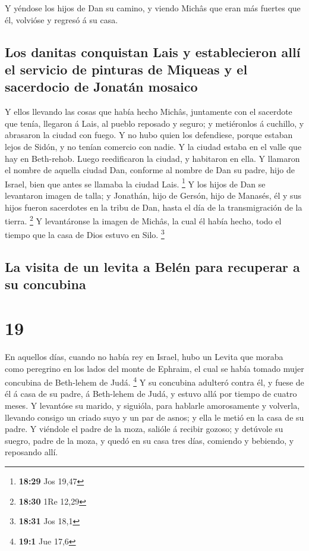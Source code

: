  Y yéndose los hijos de Dan su camino, y viendo Michâs que
eran más fuertes que él, volvióse y regresó á su casa.

\hypertarget{los-danitas-conquistan-lais-y-establecieron-alluxed-el-servicio-de-pinturas-de-miqueas-y-el-sacerdocio-de-jonatuxe1n-mosaico}{%
\subsection{Los danitas conquistan Lais y establecieron allí el servicio
de pinturas de Miqueas y el sacerdocio de Jonatán
mosaico}\label{los-danitas-conquistan-lais-y-establecieron-alluxed-el-servicio-de-pinturas-de-miqueas-y-el-sacerdocio-de-jonatuxe1n-mosaico}}

 Y ellos llevando las cosas que había hecho Michâs,
juntamente con el sacerdote que tenía, llegaron á Lais, al pueblo
reposado y seguro; y metiéronlos á cuchillo, y abrasaron la ciudad con
fuego.  Y no hubo quien los defendiese, porque estaban
lejos de Sidón, y no tenían comercio con nadie. Y la ciudad estaba en el
valle que hay en Beth-rehob. Luego reedificaron la ciudad, y habitaron
en ella.  Y llamaron el nombre de aquella ciudad Dan,
conforme al nombre de Dan su padre, hijo de Israel, bien que antes se
llamaba la ciudad Lais. \footnote{\textbf{18:29} Jos 19,47}
 Y los hijos de Dan se levantaron imagen de talla; y
Jonathán, hijo de Gersón, hijo de Manasés, él y sus hijos fueron
sacerdotes en la tribu de Dan, hasta el día de la transmigración de la
tierra. \footnote{\textbf{18:30} 1Re 12,29}  Y levantáronse
la imagen de Michâs, la cual él había hecho, todo el tiempo que la casa
de Dios estuvo en Silo. \footnote{\textbf{18:31} Jos 18,1}

\hypertarget{la-visita-de-un-levita-a-beluxe9n-para-recuperar-a-su-concubina}{%
\subsection{La visita de un levita a Belén para recuperar a su
concubina}\label{la-visita-de-un-levita-a-beluxe9n-para-recuperar-a-su-concubina}}

\hypertarget{section-18}{%
\section{19}\label{section-18}}

 En aquellos días, cuando no había rey en Israel, hubo un
Levita que moraba como peregrino en los lados del monte de Ephraim, el
cual se había tomado mujer concubina de Beth-lehem de Judá. \footnote{\textbf{19:1}
  Jue 17,6}  Y su concubina adulteró contra él, y fuese de
él á casa de su padre, á Beth-lehem de Judá, y estuvo allá por tiempo de
cuatro meses.  Y levantóse su marido, y siguióla, para
hablarle amorosamente y volverla, llevando consigo un criado suyo y un
par de asnos; y ella le metió en la casa de su padre.  Y
viéndole el padre de la moza, salióle á recibir gozoso; y detúvole su
suegro, padre de la moza, y quedó en su casa tres días, comiendo y
bebiendo, y reposando allí.

